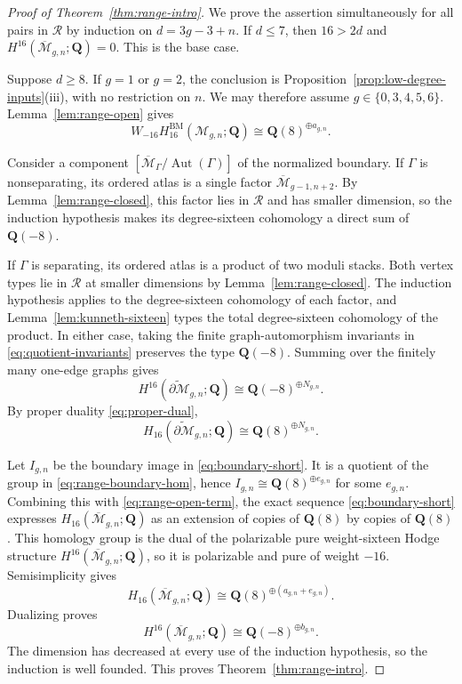\documentclass[12pt,reqno]{amsart}
\newcommand{\Q}{\mathbf{Q}}
\newcommand{\M}{\mathcal{M}}
\newcommand{\Mbar}{\overline{\mathcal{M}}}
\newcommand{\BM}{\mathrm{BM}}
\newcommand{\Aut}{\operatorname{Aut}}
\theoremstyle{definition}
\theoremstyle{remark}
\begin{document}
\begin{proof}[Proof of Theorem~\ref{thm:range-intro}]
We prove the assertion simultaneously for all pairs in $\mathcal R$ by
induction on $d=3g-3+n$.  If $d\leq7$, then $16>2d$ and
$H^{16}(\Mbar_{g,n};\Q)=0$.  This is the base case.

Suppose $d\geq8$.  If $g=1$ or $g=2$, the conclusion is
Proposition~\ref{prop:low-degree-inputs}(iii), with no restriction on $n$.
We may therefore assume $g\in\{0,3,4,5,6\}$.  Lemma~\ref{lem:range-open}
gives
\begin{equation}\label{eq:range-open-term}
 W_{-16}H_{16}^{\BM}(\M_{g,n};\Q)
 \cong\Q(8)^{\oplus a_{g,n}}.
\end{equation}

Consider a component $[\Mbar_\Gamma/\Aut(\Gamma)]$ of the normalized
boundary.  If $\Gamma$ is nonseparating, its ordered atlas is a single
factor $\Mbar_{g-1,n+2}$.  By Lemma~\ref{lem:range-closed}, this factor lies
in $\mathcal R$ and has smaller dimension, so the induction hypothesis makes
its degree-sixteen cohomology a direct sum of $\Q(-8)$.

If $\Gamma$ is separating, its ordered atlas is a product of two moduli
stacks.  Both vertex types lie in $\mathcal R$ at smaller dimensions by
Lemma~\ref{lem:range-closed}.  The induction hypothesis applies to the
degree-sixteen cohomology of each factor, and
Lemma~\ref{lem:kunneth-sixteen} types the total degree-sixteen cohomology of
the product.  In either case, taking the finite graph-automorphism invariants
in \eqref{eq:quotient-invariants} preserves the type $\Q(-8)$.  Summing over
the finitely many one-edge graphs gives
\begin{equation}\label{eq:range-boundary-cohom}
 H^{16}(\widetilde{\partial\M}_{g,n};\Q)
 \cong\Q(-8)^{\oplus N_{g,n}}.
\end{equation}
By proper duality \eqref{eq:proper-dual},
\begin{equation}\label{eq:range-boundary-hom}
 H_{16}(\widetilde{\partial\M}_{g,n};\Q)
 \cong\Q(8)^{\oplus N_{g,n}}.
\end{equation}

Let $I_{g,n}$ be the boundary image in
\eqref{eq:boundary-short}.  It is a quotient of the group in
\eqref{eq:range-boundary-hom}, hence
$I_{g,n}\cong\Q(8)^{\oplus e_{g,n}}$ for some $e_{g,n}$.  Combining this
with \eqref{eq:range-open-term}, the exact sequence
\eqref{eq:boundary-short} expresses $H_{16}(\Mbar_{g,n};\Q)$ as an
extension of copies of $\Q(8)$ by copies of $\Q(8)$.  This homology group is
the dual of the polarizable pure weight-sixteen Hodge structure
$H^{16}(\Mbar_{g,n};\Q)$, so it is polarizable and pure of weight $-16$.
Semisimplicity gives
\[
 H_{16}(\Mbar_{g,n};\Q)
 \cong\Q(8)^{\oplus(a_{g,n}+e_{g,n})}.
\]
Dualizing proves
\[
 H^{16}(\Mbar_{g,n};\Q)
 \cong\Q(-8)^{\oplus b_{g,n}}.
\]
The dimension has decreased at every use of the induction hypothesis, so the
induction is well founded.  This proves
Theorem~\ref{thm:range-intro}.
\end{proof}
\end{document}
